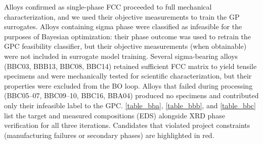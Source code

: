 Alloys confirmed as single-phase FCC proceeded to full mechanical characterization, and we used their objective measurements to train the GP surrogates. Alloys containing sigma phase were classified as infeasible for the purposes of Bayesian optimization: their phase outcome was used to retrain the GPC feasibility classifier, but their objective measurements (when obtainable) were not included in surrogate model training. Several sigma-bearing alloys (BBC03, BBB13, BBC08, BBC14) retained sufficient FCC matrix to yield tensile specimens and were mechanically tested for scientific characterization, but their properties were excluded from the BO loop. Alloys that failed during processing (BBC05--07, BBC09--10, BBC16, BBA04) produced no specimens and contributed only their infeasible label to the GPC. \autoref{table_bba}, \autoref{table_bbb}, and \autoref{table_bbc} list the target and measured compositions (EDS) alongside XRD phase verification for all three iterations. Candidates that violated project constraints (manufacturing failures or secondary phases) are highlighted in red.

